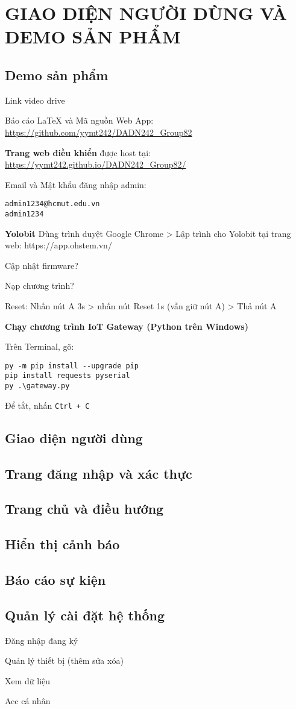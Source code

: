 \newpage
\section{GIAO DIỆN NGƯỜI DÙNG VÀ DEMO SẢN PHẨM}

\subsection{Demo sản phẩm}

Link video drive

Báo cáo LaTeX và Mã nguồn Web App: \url{https://github.com/yymt242/DADN242_Group82}

\textbf{Trang web điều khiển} được host tại: \url{https://yymt242.github.io/DADN242_Group82/}

Email và Mật khẩu đăng nhập admin:

\begin{lstlisting}[style=pythonstyle]
admin1234@hcmut.edu.vn
admin1234
\end{lstlisting}

\textbf{Yolobit}
Dùng trình duyệt Google Chrome > Lập trình cho Yolobit tại trang web: https://app.ohstem.vn/

Cập nhật firmware?

Nạp chương trình?

Reset: Nhấn nút A 3s > nhấn nút Reset 1s (vẫn giữ nút A) > Thả nút A

\textbf{Chạy chương trình IoT Gateway (Python trên Windows)}

Trên Terminal, gõ:
\begin{lstlisting}[style=pythonstyle]
py -m pip install --upgrade pip
pip install requests pyserial
py .\gateway.py
\end{lstlisting}

Để tắt, nhấn \texttt{Ctrl + C}

\subsection{Giao diện người dùng}

\subsection{Trang đăng nhập và xác thực}
\subsection{Trang chủ và điều hướng}
\subsection{Hiển thị cảnh báo}
\subsection{Báo cáo sự kiện}
\subsection{Quản lý cài đặt hệ thống}




Đăng nhập đang ký

Quản lý thiết bị (thêm sửa xóa)

Xem dữ liệu

Acc cá nhân